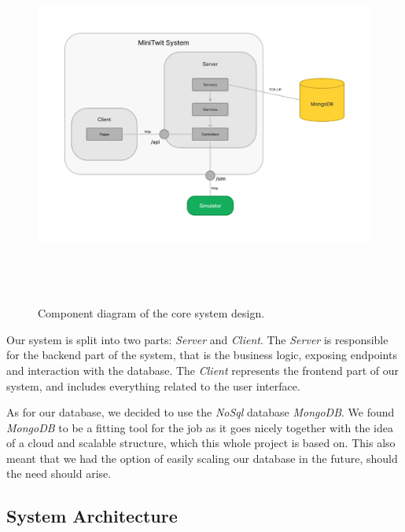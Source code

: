 \begin{figure}[H]
    \centering
    \includegraphics[width=14cm,height=12cm,keepaspectratio]{images/ComponentDiagram.png}
    \caption{Component diagram of the core system design.}
    \label{ComponentDiagram_1}
\end{figure}

Our system is split into two parts: \textit{Server} and \textit{Client}. The \textit{Server} is responsible for the backend part of the system, that is the business logic, exposing endpoints and interaction with the database. The \textit{Client} represents the frontend part of our system, and includes everything related to the user interface. %

As for our database, we decided to use the \textit{NoSql} database \textit{MongoDB}. We found \textit{MongoDB} to be a fitting tool for the job as it goes nicely together with the idea of a cloud and scalable structure, which this whole project is based on. This also meant that we had the option of easily scaling our database in the future, should the need should arise. 

\subsection{System Architecture}

